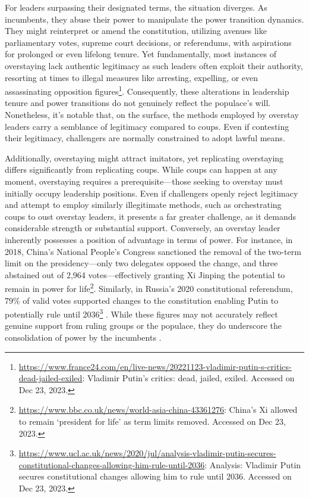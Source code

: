 \documentclass[
  12pt,
  a4paper,
  12pt]{article}
\begin{document}
For leaders surpassing their designated terms, the situation diverges.
As incumbents, they abuse their power to manipulate the power transition
dynamics. They might reinterpret or amend the constitution, utilizing
avenues like parliamentary votes, supreme court decisions, or
referendums, with aspirations for prolonged or even lifelong tenure. Yet
fundamentally, most instances of overstaying lack authentic legitimacy
as such leaders often exploit their authority, resorting at times to
illegal measures like arresting, expelling, or even assassinating
opposition figures\footnote{\url{https://www.france24.com/en/live-news/20221123-vladimir-putin-s-critics-dead-jailed-exiled}:
  Vladimir Putin's critics: dead, jailed, exiled. Accessed on Dec 23,
  2023.}. Consequently, these alterations in leadership tenure and power
transitions do not genuinely reflect the populace's will. Nonetheless,
it's notable that, on the surface, the methods employed by overstay
leaders carry a semblance of legitimacy compared to coups. Even if
contesting their legitimacy, challengers are normally constrained to
adopt lawful means.

Additionally, overstaying might attract imitators, yet replicating
overstaying differs significantly from replicating coups. While coups
can happen at any moment, overstaying requires a prerequisite---those
seeking to overstay must initially occupy leadership positions. Even if
challengers openly reject legitimacy and attempt to employ similarly
illegitimate methods, such as orchestrating coups to oust overstay
leaders, it presents a far greater challenge, as it demands considerable
strength or substantial support. Conversely, an overstay leader
inherently possesses a position of advantage in terms of power. For
instance, in 2018, China's National People's Congress sanctioned the
removal of the two-term limit on the presidency---only two delegates
opposed the change, and three abstained out of 2,964 votes---effectively
granting Xi Jinping the potential to remain in power for
life\footnote{\url{https://www.bbc.co.uk/news/world-asia-china-43361276}:
  China's Xi allowed to remain `president for life' as term limits
  removed. Accessed on Dec 23, 2023.}. Similarly, in Russia's 2020
constitutional referendum, 79\% of valid votes supported changes to the
constitution enabling Putin to potentially rule until 2036\footnote{\url{https://www.ucl.ac.uk/news/2020/jul/analysis-vladimir-putin-secures-constitutional-changes-allowing-him-rule-until-2036}:
  Analysis: Vladimir Putin secures constitutional changes allowing him
  to rule until 2036. Accessed on Dec 23, 2023.} . While these figures
may not accurately reflect genuine support from ruling groups or the
populace, they do underscore the consolidation of power by the
incumbents .
\end{document}
